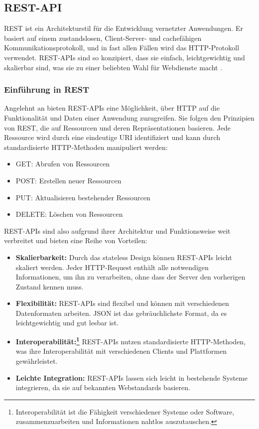\subsection{REST-API}

REST ist ein Architekturstil für die Entwicklung vernetzter Anwendungen. Er basiert auf einem zustandslosen, Client-Server- und cachefähigen Kommunikationsprotokoll, und in fast allen Fällen wird das HTTP-Protokoll verwendet. REST-APIs sind so konzipiert, dass sie einfach, leichtgewichtig und skalierbar sind, was sie zu einer beliebten Wahl für Webdienste macht \cite{REST:2024}.

\subsubsection{Einführung in REST}
Angelehnt an \cite{REST:2024} bieten REST-APIs eine Möglichkeit, über HTTP auf die Funktionalität und Daten einer Anwendung zuzugreifen. Sie folgen den Prinzipien von REST, die auf Ressourcen und deren Repräsentationen basieren. Jede Ressource wird durch eine eindeutige URI identifiziert und kann durch standardisierte HTTP-Methoden manipuliert werden:
\begin{itemize}
	\item GET: Abrufen von Ressourcen
	\item POST: Erstellen neuer Ressourcen
	\item PUT: Aktualisieren bestehender Ressourcen
	\item DELETE: Löschen von Ressourcen
\end{itemize}

REST-APIs sind also aufgrund ihrer Architektur und Funktionsweise weit verbreitet und bieten eine Reihe von Vorteilen:

\begin{itemize}
	\item \textbf{Skalierbarkeit:} Durch das stateless Design können REST-APIs leicht skaliert werden. Jeder HTTP-Request enthält alle notwendigen Informationen, um ihn zu verarbeiten, ohne dass der Server den vorherigen Zustand kennen muss.
	\item \textbf{Flexibilität:} REST-APIs sind flexibel und können mit verschiedenen Datenformaten arbeiten. JSON ist das gebräuchlichste Format, da es leichtgewichtig und gut lesbar ist.
	\item \textbf{Interoperabilität:\footnote{Interoperabilität ist die Fähigkeit verschiedener Systeme oder Software, zusammenzuarbeiten und Informationen nahtlos auszutauschen\cite{wiki:listing}.}} REST-APIs nutzen standardisierte HTTP-Methoden, was ihre Interoperabilität mit verschiedenen Clients und Plattformen gewährleistet.
	\item \textbf{Leichte Integration:} REST-APIs lassen sich leicht in bestehende Systeme integrieren, da sie auf bekannten Webstandards basieren.
\end{itemize}


